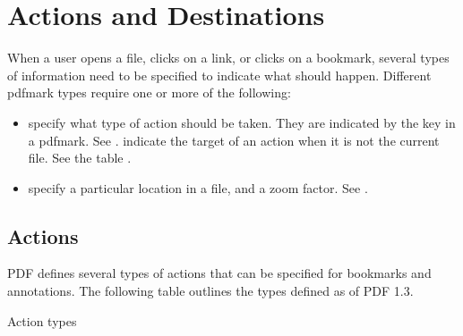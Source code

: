 \documentclass[letterpaper,12pt,english,openany,oneside]{sphinxmanual}
\begin{document}
\chapter{Actions and Destinations}
\label{\detokenize{pdfmark_Actions:actions-and-destinations}}\label{\detokenize{pdfmark_Actions::doc}}
When a user opens a file, clicks on a link, or clicks on a bookmark, several types of information need to be specified to indicate what should happen. Different pdfmark types require one or more of the following:
\begin{itemize}
\item {} 
 specify what type of action should be taken. They are indicated by the  key in a pdfmark. See .  indicate the target of an action when it is not the current file. See the table .

\item {} 
 specify a particular location in a file, and a zoom factor. See .

\end{itemize}


\section{Actions}
\label{\detokenize{pdfmark_Actions:actions}}
PDF defines several types of actions that can be specified for bookmarks and annotations. The following table outlines the types defined as of PDF 1.3.

Action types
\end{document}
